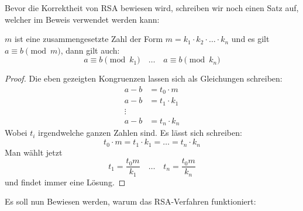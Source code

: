 \noindent
Bevor die Korrektheit von RSA bewiesen wird, schreiben wir noch einen Satz auf, welcher im
Beweis verwendet werden kann:

\begin{satz}
  \label{satz:composite-mod}
  $m$ ist eine zusammengesetzte Zahl der Form $m = k_1 \cdot k_2 \cdot \ldots \cdot k_n$ und
  es gilt $a \equiv b \pmod{m}$, dann gilt auch:
  \begin{equation*}
    a \equiv b \pmod{k_1} \quad\ldots\quad a \equiv b \pmod{k_n}
  \end{equation*}
\end{satz}
\begin{proof}
  Die eben gezeigten Kongruenzen lassen sich als Gleichungen schreiben:
  \begin{align*}
    a - b & = t_0 \cdot m   \\
    a - b & = t_1 \cdot k_1 \\
    \vdots                  \\
    a - b & = t_n \cdot k_n
  \end{align*}
  Wobei $t_i$ irgendwelche ganzen Zahlen sind. Es lässt sich schreiben:
  \begin{equation*}
    t_0 \cdot m = t_1 \cdot k_1 = \ldots = t_n \cdot k_n
  \end{equation*}
  Man wählt jetzt
  \begin{equation*}
    t_1 = \frac{t_0m}{k_1} \quad\ldots\quad t_n = \frac{t_0m}{k_n}
  \end{equation*}
  und findet immer eine Lösung.
\end{proof}

\noindent
Es soll nun Bewiesen werden, warum das RSA-Verfahren funktioniert:

